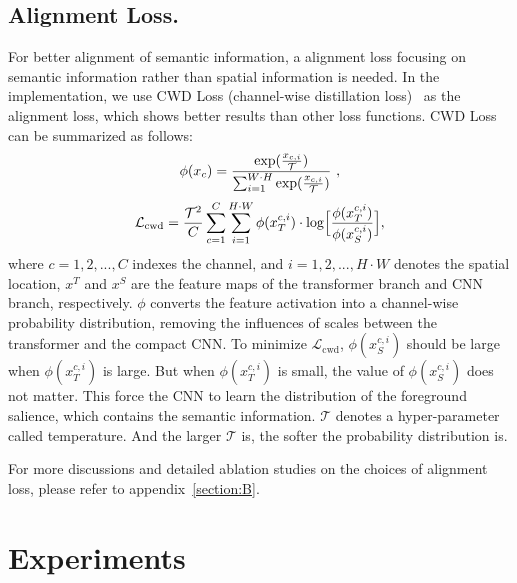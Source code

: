 \documentclass[letterpaper]{article} %
\begin{document}
\subsection{Alignment Loss.} 
For better alignment of semantic information, a alignment loss focusing on semantic information rather than spatial information is needed. In the implementation, we use CWD Loss (channel-wise distillation loss)~\cite{shu2021channel} as the alignment loss, which shows better results than other loss functions. CWD Loss can be summarized as follows:
\begin{equation}
 \phi{\left(x_{c}\right) } =  \frac{\textup{exp}{(\frac{x_{c,i}}{\mathcal{T}} )}} {\sum_{i = 1}^{W\cdot H} \textup{exp}{(\frac{x_{c,i}}{\mathcal{T}} )} }~,
 \end{equation}
\vspace{-4pt}
 \begin{equation}
 \mathcal{L}_{\text{cwd}} = \frac{\mathcal{T}^2}{C}\sum_{c = 1}^{C}\sum_{i=1}^{H\cdot W}
	\phi (x_{T}^{c,i}) \cdot \log \Bigl[
	\frac{\phi(x_{T}^{c,i})}{\phi(x_{S}^{c,i})}
	\Bigr],
	\label{eq:cw-phi}
\end{equation}
where $c = 1,2,..., C$ indexes the channel, and $ i = 1,2,..., H\cdot W$ denotes the spatial location, $x^{T}$ and $x^{S}$ are the feature maps of the transformer branch and CNN branch, respectively. $\phi$ converts the feature activation into a channel-wise probability distribution, removing the influences of scales between the transformer and the compact CNN. To minimize $ \mathcal{L}_{\text{cwd}}$, $\phi(x_{S}^{c,i})$ should be large when $\phi(x_{T}^{c,i})$ is large. But when $\phi(x_{T}^{c,i})$ is small, the value of $\phi(x_{S}^{c,i})$ does not matter. This force the CNN to learn the distribution of the foreground salience, which contains the semantic information. $\mathcal{T}$ denotes a hyper-parameter called temperature. And the larger $\mathcal{T}$ is, the softer the probability distribution is. 

For more discussions and detailed ablation studies on the choices of alignment loss, please refer to appendix~\ref{section:B}.




\section{Experiments}
\end{document}
